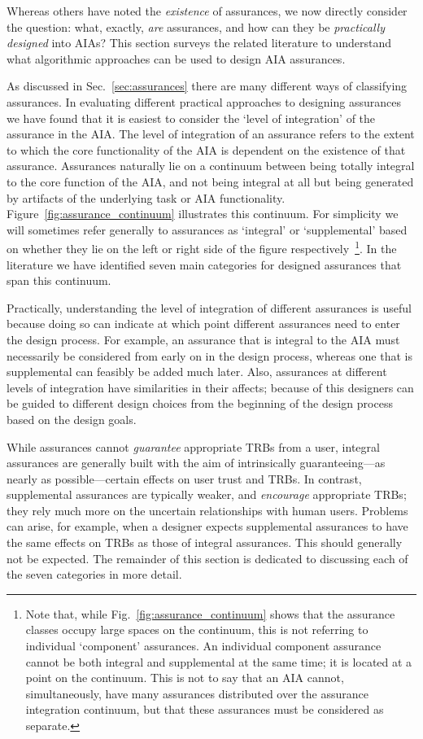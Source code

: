 Whereas others have noted the \textit{existence} of assurances, we now directly consider the question: what, exactly, \textit{are} assurances, and how can they be \textit{practically designed} into AIAs? 
This section surveys the related literature to understand what algorithmic approaches can be used to design AIA assurances. 

As discussed in Sec.~\ref{sec:assurances} there are many different ways of classifying assurances. In evaluating different practical approaches to designing assurances we have found that it is easiest to consider the `level of integration' of the assurance in the AIA. The level of integration of an assurance refers to the extent to which the core functionality of the AIA is dependent on the existence of that assurance. Assurances naturally lie on a continuum between being totally integral to the core function of the AIA, and not being integral at all but being generated by artifacts of the underlying task or AIA functionality.  Figure~\ref{fig:assurance_continuum} illustrates this continuum. For simplicity we will sometimes refer generally to assurances as `integral' or `supplemental' based on whether they lie on the left or right side of the figure respectively~\footnote{Note that, while Fig.~\ref{fig:assurance_continuum} shows that the assurance classes occupy large spaces on the continuum, this is not referring to individual `component' assurances. An individual component assurance cannot be both integral and supplemental at the same time; it is located at a point on the continuum. This is not to say that an AIA cannot, simultaneously, have many assurances distributed over the assurance integration continuum, but that these assurances must be considered as separate.}. In the literature we have identified seven main categories for designed assurances that span this continuum.

Practically, understanding the level of integration of different assurances is useful because doing so can indicate at which point different assurances need to enter the design process. For example, an assurance that is integral to the AIA must necessarily be considered from early on in the design process, whereas one that is supplemental can feasibly be added much later. Also, assurances at different levels of integration have similarities in their affects; because of this designers can be guided to different design choices from the beginning of the design process based on the design goals.

While assurances cannot \emph{guarantee} appropriate TRBs from a user, integral assurances are generally built with the aim of intrinsically guaranteeing---as nearly as possible---certain effects on user trust and TRBs. In contrast, supplemental assurances are typically weaker, and \emph{encourage} appropriate TRBs; they rely much more on the uncertain relationships with human users. Problems can arise, for example, when a designer expects supplemental assurances to have the same effects on TRBs as those of integral assurances. This should generally not be expected. The remainder of this section is dedicated to discussing each of the seven categories in more detail.

